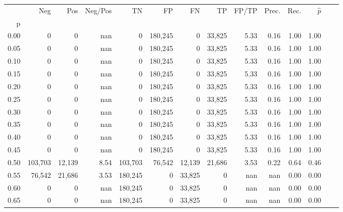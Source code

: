 \begin{tabular}{rrrrrrrrrrrrrr}
\toprule
{} &      Neg &     Pos & Neg/Pos &       TN &       FP &      FN &      TP & FP/TP & Prec. &  Rec. & $\hat{p}$ \\
p    &          &         &         &          &          &         &         &       &       &       &           \\
\midrule
0.00 &        0 &       0 &     nan &        0 &  180,245 &       0 &  33,825 &  5.33 &  0.16 &  1.00 &      1.00 \\
0.05 &        0 &       0 &     nan &        0 &  180,245 &       0 &  33,825 &  5.33 &  0.16 &  1.00 &      1.00 \\
0.10 &        0 &       0 &     nan &        0 &  180,245 &       0 &  33,825 &  5.33 &  0.16 &  1.00 &      1.00 \\
0.15 &        0 &       0 &     nan &        0 &  180,245 &       0 &  33,825 &  5.33 &  0.16 &  1.00 &      1.00 \\
0.20 &        0 &       0 &     nan &        0 &  180,245 &       0 &  33,825 &  5.33 &  0.16 &  1.00 &      1.00 \\
0.25 &        0 &       0 &     nan &        0 &  180,245 &       0 &  33,825 &  5.33 &  0.16 &  1.00 &      1.00 \\
0.30 &        0 &       0 &     nan &        0 &  180,245 &       0 &  33,825 &  5.33 &  0.16 &  1.00 &      1.00 \\
0.35 &        0 &       0 &     nan &        0 &  180,245 &       0 &  33,825 &  5.33 &  0.16 &  1.00 &      1.00 \\
0.40 &        0 &       0 &     nan &        0 &  180,245 &       0 &  33,825 &  5.33 &  0.16 &  1.00 &      1.00 \\
0.45 &        0 &       0 &     nan &        0 &  180,245 &       0 &  33,825 &  5.33 &  0.16 &  1.00 &      1.00 \\
0.50 &  103,703 &  12,139 &    8.54 &  103,703 &   76,542 &  12,139 &  21,686 &  3.53 &  0.22 &  0.64 &      0.46 \\
0.55 &   76,542 &  21,686 &    3.53 &  180,245 &        0 &  33,825 &       0 &   nan &   nan &  0.00 &      0.00 \\
0.60 &        0 &       0 &     nan &  180,245 &        0 &  33,825 &       0 &   nan &   nan &  0.00 &      0.00 \\
0.65 &        0 &       0 &     nan &  180,245 &        0 &  33,825 &       0 &   nan &   nan &  0.00 &      0.00 \\

\end{tabular}
